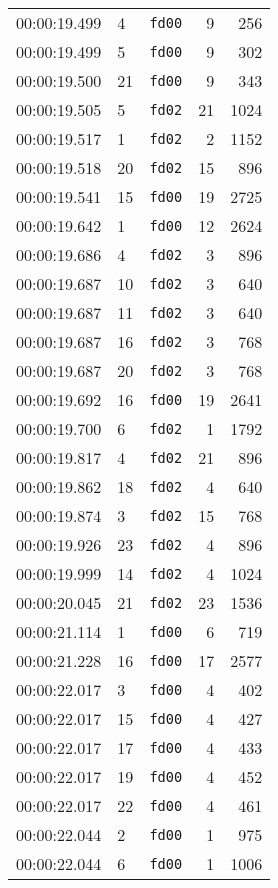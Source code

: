 \documentclass{article}
\begin{document}
\begin{longtable}{lllrr}
00:00:19.499 & 4 & \texttt{fd00} & 9 & 256 \\
00:00:19.499 & 5 & \texttt{fd00} & 9 & 302 \\
00:00:19.500 & 21 & \texttt{fd00} & 9 & 343 \\
00:00:19.505 & 5 & \texttt{fd02} & 21 & 1024 \\
00:00:19.517 & 1 & \texttt{fd02} & 2 & 1152 \\
00:00:19.518 & 20 & \texttt{fd02} & 15 & 896 \\
00:00:19.541 & 15 & \texttt{fd00} & 19 & 2725 \\
00:00:19.642 & 1 & \texttt{fd00} & 12 & 2624 \\
00:00:19.686 & 4 & \texttt{fd02} & 3 & 896 \\
00:00:19.687 & 10 & \texttt{fd02} & 3 & 640 \\
00:00:19.687 & 11 & \texttt{fd02} & 3 & 640 \\
00:00:19.687 & 16 & \texttt{fd02} & 3 & 768 \\
00:00:19.687 & 20 & \texttt{fd02} & 3 & 768 \\
00:00:19.692 & 16 & \texttt{fd00} & 19 & 2641 \\
00:00:19.700 & 6 & \texttt{fd02} & 1 & 1792 \\
00:00:19.817 & 4 & \texttt{fd02} & 21 & 896 \\
00:00:19.862 & 18 & \texttt{fd02} & 4 & 640 \\
00:00:19.874 & 3 & \texttt{fd02} & 15 & 768 \\
00:00:19.926 & 23 & \texttt{fd02} & 4 & 896 \\
00:00:19.999 & 14 & \texttt{fd02} & 4 & 1024 \\
00:00:20.045 & 21 & \texttt{fd02} & 23 & 1536 \\
00:00:21.114 & 1 & \texttt{fd00} & 6 & 719 \\
00:00:21.228 & 16 & \texttt{fd00} & 17 & 2577 \\
00:00:22.017 & 3 & \texttt{fd00} & 4 & 402 \\
00:00:22.017 & 15 & \texttt{fd00} & 4 & 427 \\
00:00:22.017 & 17 & \texttt{fd00} & 4 & 433 \\
00:00:22.017 & 19 & \texttt{fd00} & 4 & 452 \\
00:00:22.017 & 22 & \texttt{fd00} & 4 & 461 \\
00:00:22.044 & 2 & \texttt{fd00} & 1 & 975 \\
00:00:22.044 & 6 & \texttt{fd00} & 1 & 1006 \\

\end{longtable}
\end{document}
